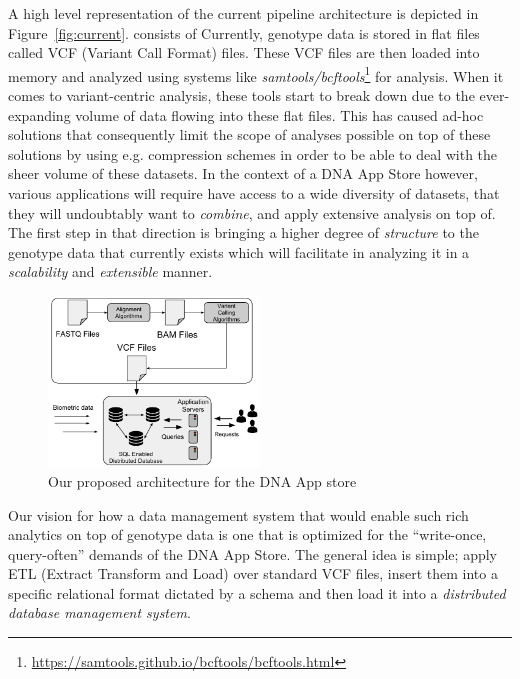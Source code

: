 \documentclass[conference,twocolumn,10pt]{IEEEtran}
\begin{document}
A high level representation of the current pipeline architecture is depicted in Figure~\ref{fig:current}.  consists of Currently, genotype data is stored in flat files called VCF (Variant Call Format) files. These VCF files are then loaded into memory and analyzed using systems like \textit{samtools/bcftools}\footnote{\small \url{https://samtools.github.io/bcftools/bcftools.html}} for analysis. When it comes to variant-centric analysis, these tools start to break down due to the ever-expanding volume of data flowing into these flat files. This has caused ad-hoc solutions that consequently limit the scope of analyses possible on top of these solutions by using e.g. compression schemes in order to be able to deal with the sheer volume of these datasets. In the context of a DNA App Store however, various applications will require have access to a wide diversity of datasets, that they will undoubtably want to \textit{combine}, and apply extensive analysis on top of. The first step in that direction is bringing a higher degree of \textit{structure} to the genotype data that currently exists which will facilitate in analyzing it in a \textit{scalability} and \textit{extensible} manner.

\begin{figure}[t]
    \centering
    \includegraphics[width=0.50\textwidth]{proposed-pipeline}
    \caption{Our proposed architecture for the DNA App store}
    \label{fig:proposed}
    \vspace{-10pt}
\end{figure}

Our vision for how a data management system that would enable such rich analytics on top of genotype data is one that is optimized for the “write-once, query-often” demands of the DNA App Store. The general idea is simple; apply ETL (Extract Transform and Load) over standard VCF files, insert them into a specific relational format dictated by a schema and then load it into a \textit{distributed database management system}.
\end{document}
